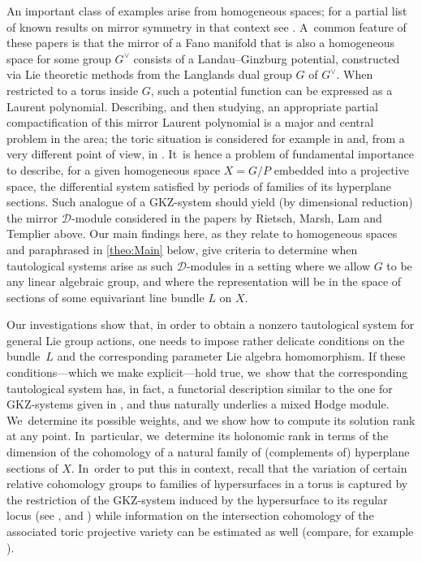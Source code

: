 \documentclass[11pt]{article}
\newcommand{\cD}{\mathscr{D}}
\begin{document}
An important class of examples arise from homogeneous spaces; for a
partial list of known results on mirror symmetry in that context see
\cite{Rietsch, Marsh-Rietsch, Lam-Templier}. A~common feature of these
papers is that the mirror of a Fano manifold that is
also a homogeneous space for some group $G^\vee$ consists of a
Landau--Ginzburg potential, constructed via Lie theoretic methods from
the Langlands dual group $G$ of $G^\vee$. When restricted to a torus
inside $G$, such a potential function can be expressed as a Laurent
polynomial. Describing, and then studying, an appropriate partial
compactification of this mirror Laurent polynomial is a major and
central problem in the area; the toric situation is considered for
example in \cite{RS12} and, from a very different point of view, in
\cite{Siebert-TropLG}. It~is hence a problem of fundamental importance to
describe, for a given homogeneous space $X=G/P$ embedded into a
projective space, the differential system satisfied by periods of
families of its hyperplane sections. Such analogue
of a GKZ-system should yield (by dimensional reduction) the
mirror $\mathscr{D}$\nobreakdash-mod\-ule considered in the papers by Rietsch,
Marsh, Lam and Templier above.
Our main findings here, as they relate to homogeneous
spaces and
paraphrased in \cref{theo:Main} below, give criteria to determine when
tautological systems arise as such $\cD$\nobreakdash-mod\-ules in a setting where we
allow $G$ to be any linear algebraic group, and where the
representation will be in the space of sections of some equivariant
line bundle $L$ on $X$.

Our investigations show that, in order to obtain a
nonzero tautological system for general Lie group actions, one
needs to impose rather delicate conditions on the bundle~$L$ and the
corresponding parameter Lie algebra homomorphism. If
these conditions---which we make explicit---hold true, we~show that
the corresponding tautological system has, in fact, a
functorial description similar to the one for
GKZ-systems given in \cite{GKZ90,SW09}, and thus naturally
underlies a mixed Hodge module. We~determine its possible weights, and
we show how to compute its solution rank at any point. In~particular, we~determine its holonomic rank in terms of the dimension of the
cohomology of a natural family of (complements of) hyperplane sections
of $X$. In~order to put this in context, recall that
the variation of certain relative cohomology
groups to families of hypersurfaces in a torus is captured
by the restriction of the GKZ-system induced by the hypersurface to
its regular locus (see \cite[Th.\,2.13]{Reich2},
\cite{Stienstra} and \cite{ReichWalth-Duco}) while information on the
intersection cohomology of the associated toric projective variety
can be estimated as well (compare, for example
\cite[Prop.\,2.14]{RS12}).
\end{document}
